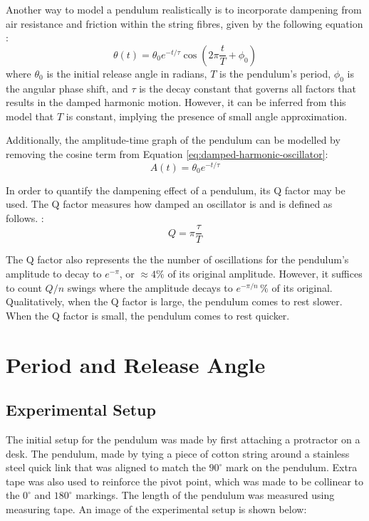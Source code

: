 \documentclass[12pt]{article}
\begin{document}
Another way to model a pendulum realistically is to incorporate dampening from air resistance and friction within the string fibres, given by the following equation \cite{damped-oscillations}:
\begin{equation} \label{eq:damped-harmonic-oscillator}
    \theta(t) = \theta_0 e^{-{t/\tau}} \cos\left(2\pi\frac{t}{T} + \phi_0\right)
\end{equation}
where $\theta_0$ is the initial release angle in radians, $T$ is the pendulum's period, $\phi_0$ is the angular phase shift, and $\tau$ {\color{blue} is the decay constant that governs all factors that results in the damped harmonic motion. However, it can be inferred from this model that $T$ is constant, implying the presence of small angle approximation.}

{\color{blue}
Additionally, the amplitude-time graph of the pendulum can be modelled by removing the cosine term from Equation \ref{eq:damped-harmonic-oscillator}:
\begin{equation} \label{eq:amplitude-function}
    A(t) = \theta_0 e^{-{t/\tau}}
\end{equation}}

In order to quantify the dampening effect of a pendulum, its Q factor may be used. The Q factor measures how damped an oscillator is and is defined as follows. \cite{pnp-physics}:
\begin{equation} \label{eq:q-factor-formula}
    Q = \pi\frac{\tau}{T}
\end{equation}

The Q factor also represents the the number of oscillations for the pendulum's amplitude to decay to $e^{-\pi}$, or $\approx 4\%$ of its original amplitude. {\color{blue}However, it suffices to count $Q/n$ swings where the amplitude decays to $e^{-\pi/n}\,\%$ of its original. Qualitatively, when the Q factor is large, the pendulum comes to rest slower. When the Q factor is small, the pendulum comes to rest quicker.}

\newpage

\section{Period and Release Angle}

\subsection{Experimental Setup}
The initial setup for the pendulum was made by first attaching a protractor on a desk. The pendulum, made by tying a piece of cotton string around a stainless steel quick link {\color{blue} that was aligned to match the $90^{\circ}$ mark on the pendulum. Extra tape was also used to reinforce the pivot point, which was made to be collinear to the $0^{\circ}$ and $180^{\circ}$ markings.} The length of the pendulum was measured using measuring tape. An image of the experimental setup is shown below:
\end{document}
